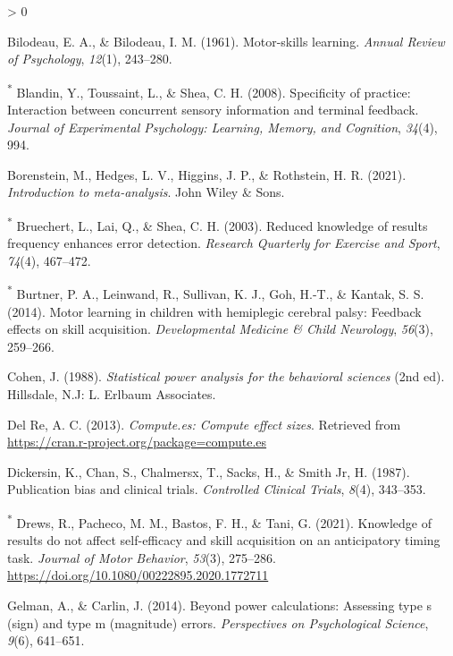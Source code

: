 \documentclass[
  english,
  man,mask,floatsintext]{apa7}
\newlength{\cslhangindent}
\newenvironment{CSLReferences}[2] %
 {%
  \setlength{\parindent}{0pt}
  \ifodd #1 \everypar{\setlength{\hangindent}{\cslhangindent}}\ignorespaces\fi
  \ifnum #2 > 0
  \setlength{\parskip}{#2\baselineskip}
  \fi
 }%
 {}
\begin{document}
\begin{CSLReferences}{1}{0}
\leavevmode\hypertarget{ref-Bilodeau1961}{}%
Bilodeau, E. A., \& Bilodeau, I. M. (1961). Motor-skills learning. \emph{Annual Review of Psychology}, \emph{12}(1), 243--280.

\leavevmode\hypertarget{ref-Blandin2008}{}%
\textsuperscript{*} Blandin, Y., Toussaint, L., \& Shea, C. H. (2008). Specificity of practice: Interaction between concurrent sensory information and terminal feedback. \emph{Journal of Experimental Psychology: Learning, Memory, and Cognition}, \emph{34}(4), 994.

\leavevmode\hypertarget{ref-Borenstein2021}{}%
Borenstein, M., Hedges, L. V., Higgins, J. P., \& Rothstein, H. R. (2021). \emph{Introduction to meta-analysis}. John Wiley \& Sons.

\leavevmode\hypertarget{ref-Bruechert2003}{}%
\textsuperscript{*} Bruechert, L., Lai, Q., \& Shea, C. H. (2003). Reduced knowledge of results frequency enhances error detection. \emph{Research Quarterly for Exercise and Sport}, \emph{74}(4), 467--472.

\leavevmode\hypertarget{ref-Burtner2014}{}%
\textsuperscript{*} Burtner, P. A., Leinwand, R., Sullivan, K. J., Goh, H.-T., \& Kantak, S. S. (2014). Motor learning in children with hemiplegic cerebral palsy: Feedback effects on skill acquisition. \emph{Developmental Medicine \& Child Neurology}, \emph{56}(3), 259--266.

\leavevmode\hypertarget{ref-Cohen1988}{}%
Cohen, J. (1988). \emph{Statistical power analysis for the behavioral sciences} (2nd ed). Hillsdale, N.J: L. Erlbaum Associates.

\leavevmode\hypertarget{ref-DelRe2013}{}%
Del Re, A. C. (2013). \emph{Compute.es: Compute effect sizes}. Retrieved from \url{https://cran.r-project.org/package=compute.es}

\leavevmode\hypertarget{ref-Dickersin1987}{}%
Dickersin, K., Chan, S., Chalmersx, T., Sacks, H., \& Smith Jr, H. (1987). Publication bias and clinical trials. \emph{Controlled Clinical Trials}, \emph{8}(4), 343--353.

\leavevmode\hypertarget{ref-Drews2021}{}%
\textsuperscript{*} Drews, R., Pacheco, M. M., Bastos, F. H., \& Tani, G. (2021). Knowledge of results do not affect self-efficacy and skill acquisition on an anticipatory timing task. \emph{Journal of Motor Behavior}, \emph{53}(3), 275--286. \url{https://doi.org/10.1080/00222895.2020.1772711}

\leavevmode\hypertarget{ref-Gelman2014}{}%
Gelman, A., \& Carlin, J. (2014). Beyond power calculations: Assessing type s (sign) and type m (magnitude) errors. \emph{Perspectives on Psychological Science}, \emph{9}(6), 641--651.


\end{CSLReferences}
\end{document}
